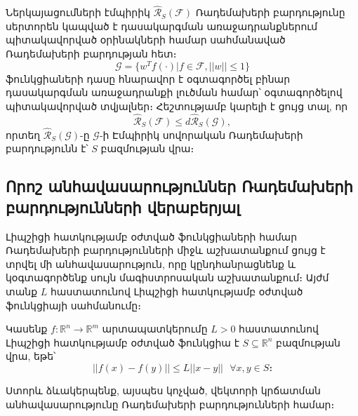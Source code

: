 \documentclass[12pt]{article}
\begin{document}
\begin{remark*}
Ներկայացումների էմպիրիկ $\mathcal{\hat{R}}_S(\mathcal{F})$ Ռադեմախերի բարդությունը սերտորեն կապված է դասակարգման առաջադրանքներում պիտակավորված օրինակների համար սահմանաված Ռադեմախերի բարդության հետ։ $$\mathcal{G}  = \{w^Tf(\cdot)| f \in \mathcal{F}, ||w|| \leq 1 \}$$
ֆունկցիաների դասը հնարավոր է օգտագործել բինար դասակարգման առաջադրանքի լուծման համար՝ օգտագործելով պիտակավորված տվյալներ։ Հեշտությամբ կարելի է ցույց տալ, որ $$\hat{\mathcal{R}}_S(\mathcal{F}) \leq d \hat{\mathcal{R}}_S(\mathcal{G}),$$
որտեղ $\hat{\mathcal{R}}_S(\mathcal{G})$-ը $\mathcal{G}$-ի Էմպիրիկ  սովորական Ռադեմախերի բարդությունն է՝ $S$ բազմության վրա։
\end{remark*}


{}


\subsection*{ \centering Որոշ անհավասարություններ Ռադեմախերի \\ բարդությունների վերաբերյալ } \noindent



Լիպշիցի հատկությամբ օժտված ֆունկցիաների համար Ռադեմախերի բարդությունների միջև \cite{bib_item_11} աշխատանքում ցույց է տրվել մի անհավասարություն, որը կընդհանրացնենք և կօգտագործենք սույն մագիստրոսական աշխատանքում։  Այժմ տանք $L$ հաստատունով Լիպշիցի հատկությամբ օժտված ֆունկցիայի սահմանումը։
\begin{defination}
Կասենք $f:\mathbb{R}^n \rightarrow \mathbb{R}^m$ արտապատկերումը $L > 0$ հաստատունով Լիպշիցի հատկությամբ օժտված ֆունկցիա է $S \subseteq \mathbb{R}^n$ բազմության վրա, եթե՝
$$||f(x)-f(y)|| \leq L||x-y||   \text{ } \forall x, y \in S։$$ 
\end{defination}

Ստորև ձևակերպենք, այսպես կոչված, վեկտորի կրճատման անհավասարությունը Ռադեմախերի բարդությունների համար։
\end{document}

